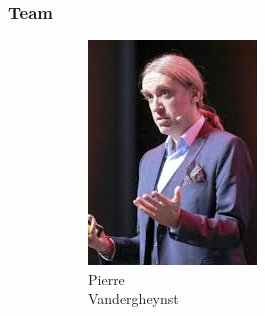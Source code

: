 \documentclass[aspectratio=169]{beamer}
\begin{document}

\begin{frame}
	\frametitle{Team}
	\begin{figure}
		\centering
		\captionsetup{justification=centering}
		\begin{subfigure}[b]{0.14\linewidth}
			\includegraphics[width=\linewidth]{picture_pierre}
			\caption*{Pierre\\Vandergheynst}
		\end{subfigure}
		\hfill
		\begin{subfigure}[b]{0.14\linewidth}

\end{subfigure}
\end{figure}
\end{frame}
\end{document}
